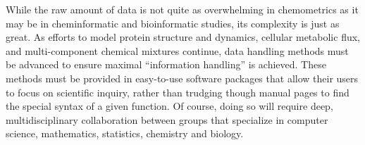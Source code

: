 \begin{doublespace}
While the raw amount of data is not quite as overwhelming in chemometrics as
it may be in cheminformatic and bioinformatic studies, its complexity is just
as great. As efforts to model protein structure and dynamics, cellular
metabolic flux, and multi-component chemical mixtures continue, data handling
methods must be advanced to ensure maximal ``information handling'' is
achieved. These methods must be provided in easy-to-use software packages
that allow their users to focus on scientific inquiry, rather than trudging
though manual pages to find the special syntax of a given function. Of course,
doing so will require deep, multidisciplinary collaboration between groups
that specialize in computer science, mathematics, statistics, chemistry and
biology.
\end{doublespace}





